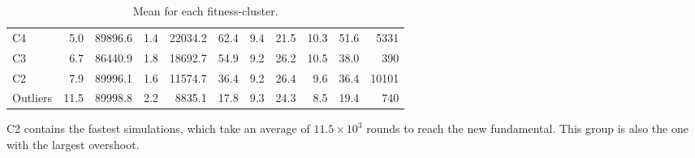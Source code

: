 \begin{table}
\begin{tabular}{l|rrrr|rrrrrr}
C4  &         5.0 &       89896.6 &     1.4 &                     22034.2 &          62.4 &          9.4 &            21.5 &           10.3 &          51.6 &  5331 \\
C3  &         6.7 &       86440.9 &     1.8 &                     18692.7 &          54.9 &          9.2 &            26.2 &           10.5 &          38.0 &   390 \\
C2  &         7.9 &       89996.1 &     1.6 &                     11574.7 &          36.4 &          9.2 &            26.4 &            9.6 &          36.4 &  10101 \\
Outliers  &        11.5 &       89998.8 &     2.2 &                      8835.1 &          17.8 &          9.3 &            24.3 &            8.5 &          19.4 &   740 \\
\bottomrule
\end{tabular}
 \label{table:fit_gmm_all_mean}
 \caption{Mean for each fitness-cluster.}
 \end{table}
 
 C2 contains the fastest simulations, which take an average of $11.5\times 10^3$ rounds to reach the new fundamental. This group is also the one with the largest overshoot. 

